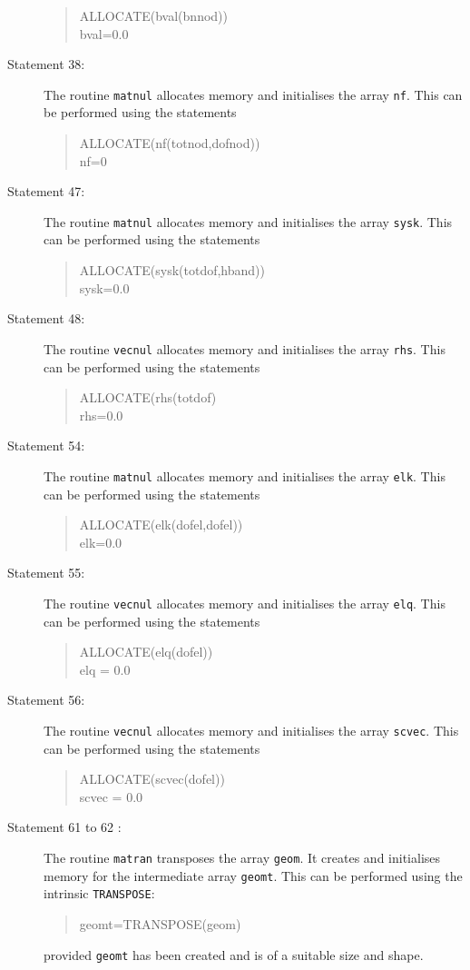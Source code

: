 \begin{description}
\begin{quote}
\source
ALLOCATE(bval(bnnod))\\
bval=0.0
\end{quote}
\item[Statement 38:]  The routine {\tt matnul} allocates memory and initialises
the array {\tt nf}. This can be performed using the statements
\begin{quote}
\source
ALLOCATE(nf(totnod,dofnod))\\
nf=0
\end{quote}
\item[Statement 47:]  The routine {\tt matnul} allocates memory and initialises
the array {\tt sysk}. This can be performed using the statements
\begin{quote}
\source
ALLOCATE(sysk(totdof,hband))\\
sysk=0.0
\end{quote}
\item[Statement 48:] The routine {\tt vecnul} allocates memory and initialises
the array {\tt rhs}. This can be performed using the statements
\begin{quote}
\source
ALLOCATE(rhs(totdof)\\
rhs=0.0
\end{quote}
\item[Statement 54:] The routine {\tt matnul} allocates memory and initialises
the array {\tt elk}. This can be performed using the statements
\begin{quote}
\source
ALLOCATE(elk(dofel,dofel))\\
elk=0.0
\end{quote}
\item[Statement 55:] The routine {\tt vecnul} allocates memory and initialises
the array {\tt elq}. This can be performed using the statements
\begin{quote}
\source
ALLOCATE(elq(dofel))\\
elq = 0.0
\end{quote}
\item[Statement 56:] The routine {\tt vecnul} allocates memory and initialises
the array {\tt scvec}. This can be performed using the statements
\begin{quote}
\source
ALLOCATE(scvec(dofel))\\
scvec = 0.0
\end{quote}
\item[Statement 61 to 62 :] The routine {\tt matran} transposes the array {\tt geom}.
It creates and initialises memory for the intermediate
array {\tt geomt}. This can be performed using the intrinsic {\tt TRANSPOSE}:
\begin{quote}
\source
geomt=TRANSPOSE(geom)
\end{quote}
provided {\tt geomt} has been created and is of a suitable size and shape.


\end{description}
